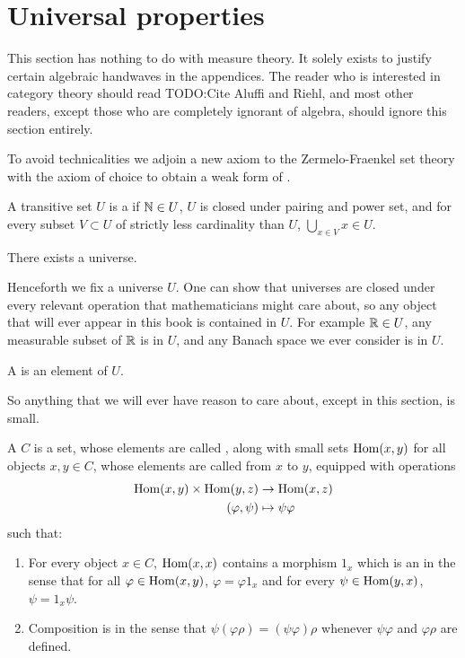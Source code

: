 \section{Universal properties}
This section has nothing to do with measure theory.
It solely exists to justify certain algebraic handwaves in the appendices.
The reader who is interested in category theory should read TODO:Cite Aluffi and Riehl, and most other readers, except those who are completely ignorant of algebra, should ignore this section entirely.

To avoid technicalities we adjoin a new axiom to the Zermelo-Fraenkel set theory with the axiom of choice to obtain a weak form of .

\begin{definition}
A transitive set $U$ is a  if $\mathbb{N} \in U$, $U$ is closed under pairing and power set, and for every subset $V \subset U$ of strictly less cardinality than $U$, $\bigcup_{x \in V} x \in U$.
\end{definition}
\begin{axiom}[universe]
There exists a universe.
\end{axiom}
Henceforth we fix a universe $U$.
One can show that universes are closed under every relevant operation that mathematicians might care about, so any object that will ever appear in this book is contained in $U$.
For example $\mathbb{R} \in U$, any measurable subset of $\mathbb{R}$ is in $U$, and any Banach space we ever consider is in $U$.
\begin{definition}
A  is an element of $U$.
\end{definition}
So anything that we will ever have reason to care about, except in this section, is small.

\begin{definition}
A  $C$ is a set, whose elements are called , along with small sets $\operatorname{Hom}(x, y)$ for all objects $x, y \in C$, whose elements are called  from $x$ to $y$, equipped with  operations
\begin{align*}
\operatorname{Hom}(x, y) \times \operatorname{Hom}(y, z) &\to \operatorname{Hom}(x, z)\\
(\varphi, \psi) &\mapsto \psi \varphi
\end{align*}
such that:
\begin{enumerate}
\item For every object $x \in C$, $\operatorname{Hom}(x, x)$ contains a morphism $1_x$ which is an  in the sense that for all $\varphi \in \operatorname{Hom}(x, y)$, $\varphi = \varphi 1_x$ and for every $\psi \in \operatorname{Hom}(y, x)$, $\psi = 1_x \psi$.
\item Composition is  in the sense that $\psi(\varphi\rho) = (\psi\varphi)\rho$ whenever $\psi\varphi$ and $\varphi\rho$ are defined.
\end{enumerate}
\end{definition}

